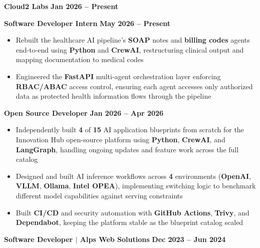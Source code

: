 \documentclass{article}
\begin{document}
{\large \noindent \textbf{Cloud2 Labs}} \hfill \textbf{Jan 2026 -- Present}

\noindent \textbf{Software Developer Intern} \hfill \textbf{May 2026 -- Present}

{\small
\begin{itemize}[noitemsep, nolistsep, leftmargin=*, itemsep=1mm]
\item Rebuilt the healthcare AI pipeline's \textbf{SOAP} notes and \textbf{billing codes} agents end-to-end using \textbf{Python} and \textbf{CrewAI}, restructuring clinical output and mapping documentation to medical codes

\item Engineered the \textbf{FastAPI} multi-agent orchestration layer enforcing \textbf{RBAC/ABAC} access control, ensuring each agent accesses only authorized data as protected health information flows through the pipeline
\end{itemize}
}

\vspace{2mm}

\noindent \textbf{Open Source Developer} \hfill \textbf{Jan 2026 -- Apr 2026}

{\small
\begin{itemize}[noitemsep, nolistsep, leftmargin=*, itemsep=1mm]
\item Independently built \textbf{4} of \textbf{15} AI application blueprints from scratch for the Innovation Hub open-source platform using \textbf{Python}, \textbf{CrewAI}, and \textbf{LangGraph}, handling ongoing updates and feature work across the full catalog

\item Designed and built AI inference workflows across \textbf{4} environments (\textbf{OpenAI}, \textbf{VLLM}, \textbf{Ollama}, \textbf{Intel OPEA}), implementing switching logic to benchmark different model capabilities against serving constraints

\item Built \textbf{CI/CD} and security automation with \textbf{GitHub Actions}, \textbf{Trivy}, and \textbf{Dependabot}, keeping the platform stable as the blueprint catalog scaled
\end{itemize}
}

\vspace{3mm}

{\large \noindent \textbf{Software Developer $\mid$ Alps Web Solutions}} \hfill \textbf{Dec 2023 -- Jun 2024}
\end{document}
